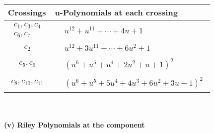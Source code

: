 \documentclass[1p]{elsarticle_modified}
\theoremstyle{definition}
\begin{document}
\begin{tabular}{m{50pt}|m{274pt}}
Crossings & \hspace{64pt}u-Polynomials at each crossing \\
\hline $$\begin{aligned}c_{1},c_{3},c_{4}\\c_{6},c_{7}\end{aligned}$$&$\begin{aligned}
&u^{12}+u^{11}+\cdots+4 u+1
\end{aligned}$\\
\hline $$\begin{aligned}c_{2}\end{aligned}$$&$\begin{aligned}
&u^{12}+3 u^{11}+\cdots+6 u^2+1
\end{aligned}$\\
\hline $$\begin{aligned}c_{5},c_{9}\end{aligned}$$&$\begin{aligned}
&(u^6+u^5+u^4+2 u^2+u+1)^2
\end{aligned}$\\
\hline $$\begin{aligned}c_{8},c_{10},c_{11}\end{aligned}$$&$\begin{aligned}
&(u^6+u^5+5 u^4+4 u^3+6 u^2+3 u+1)^2
\end{aligned}$\\
\hline
\end{tabular}\\~\\
\newpage\renewcommand{\arraystretch}{1}
\flushleft \textbf{(v) Riley Polynomials at the component}\newline \\
\end{document}
